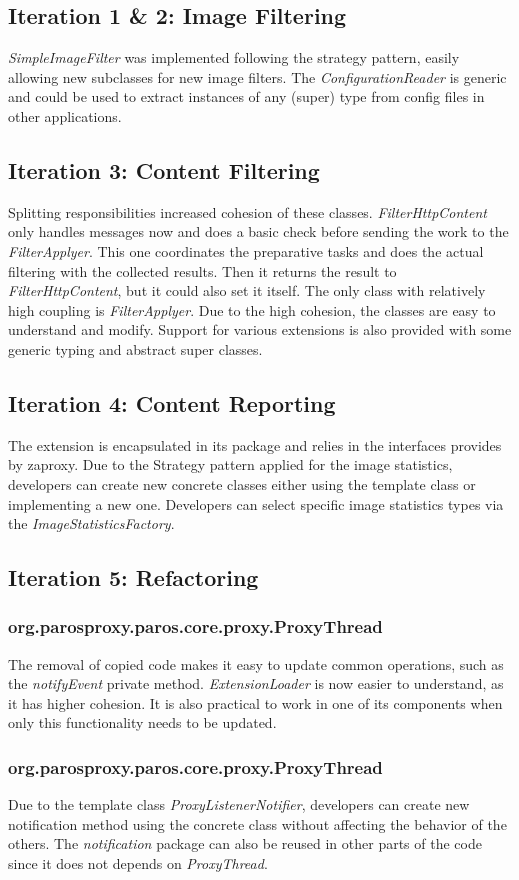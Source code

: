 \subsection{Iteration 1 \& 2: Image Filtering}
\textit{SimpleImageFilter} was implemented following the strategy pattern, easily allowing new subclasses for new image filters.
The \textit{ConfigurationReader} is generic and could be used to extract instances of any (super) type from config files in other applications.

\subsection{Iteration 3: Content Filtering}
Splitting responsibilities increased cohesion of these classes. \textit{FilterHttpContent} only handles messages now and does a basic check before sending the work to the \textit{FilterApplyer}. This one coordinates the preparative tasks and does the actual filtering with the collected results. Then it returns the result to \textit{FilterHttpContent}, but it could also set it itself.
The only class with relatively high coupling is \textit{FilterApplyer}.
Due to the high cohesion, the classes are easy to understand and modify. Support for various extensions is also provided with some generic typing and abstract super classes.
\subsection{Iteration 4: Content Reporting}
The extension is encapsulated in its package and relies in the interfaces provides by zaproxy. Due to the Strategy pattern applied for the image statistics, developers can create new concrete classes either using the template class or implementing a new one. Developers can select specific image statistics types via the \textit{ImageStatisticsFactory}.

\subsection{Iteration 5: Refactoring}
\subsubsection{org.parosproxy.paros.core.proxy.ProxyThread}
The removal of copied code makes it easy to update common operations, such as the \textit{notifyEvent} private method.
\textit{ExtensionLoader} is now easier to understand, as it has higher cohesion. It is also practical to work in one of its components when only this functionality needs to be updated.
\subsubsection{org.parosproxy.paros.core.proxy.ProxyThread}

Due to the template class \textit{ProxyListenerNotifier}, developers can create new notification method using the concrete class without affecting the behavior of the others. The \textit{notification} package can also be reused in other parts of the code since it does not depends on \textit{ProxyThread}. 
